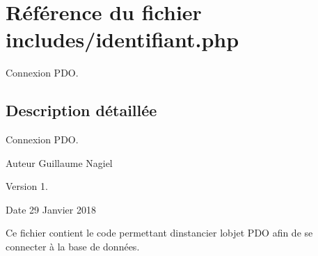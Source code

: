 \hypertarget{identifiant_8php}{}\section{Référence du fichier includes/identifiant.php}
\label{identifiant_8php}


Connexion P\+DO.  




\subsection{Description détaillée}
Connexion P\+DO. 

\begin{DoxyAuthor}{Auteur}
Guillaume Nagiel 
\end{DoxyAuthor}
\begin{DoxyVersion}{Version}
1. 
\end{DoxyVersion}
\begin{DoxyDate}{Date}
29 Janvier 2018
\end{DoxyDate}
Ce fichier contient le code permettant d\textquotesingle{}instancier l\textquotesingle{}objet P\+DO afin de se connecter à la base de données. 